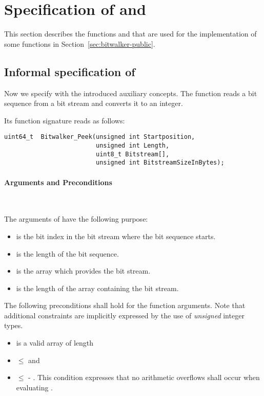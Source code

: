 
\section{Specification of \peek and \poke}
\label{sec:bitwalker-private}

This section describes the functions \peek and \poke that 
are used for the implementation of some functions in Section~\ref{sec:bitwalker-public}.

\subsection{Informal specification of \peek}
\label{sec:informal-peek}

Now we specify \peek with the introduced auxiliary concepts.
The function \peek reads a bit sequence from a bit stream
and converts it to an integer.

Its function signature reads as follows:

\begin{lstlisting}[style=acsl-block]
uint64_t  Bitwalker_Peek(unsigned int Startposition, 
                         unsigned int Length,
                         uint8_t Bitstream[],
                         unsigned int BitstreamSizeInBytes);
\end{lstlisting}


\paragraph{Arguments and Preconditions}~

The arguments of \peek have the following purpose:
\begin{itemize}
    \item {} is the bit index in the bit stream 
    where the bit sequence starts.
    \item {} is the length of the bit sequence.
    \item {} is the array which provides the bit stream.
    \item {} is the length of the array 
    containing the bit stream. 
\end{itemize}

The following preconditions shall hold for the function arguments.
Note that additional constraints are implicitly expressed by the use
of \emph{unsigned} integer types.

\begin{itemize}
\item {} is a valid array of length 

\item {} $\leq$  and

\item {} $\leq$  - .
      This condition expresses that no arithmetic overflows shall occur
      when evaluating .
\end{itemize}

